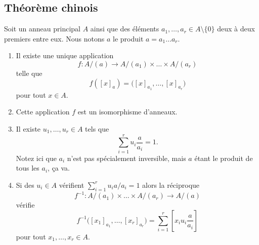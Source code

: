 \subsection{Théorème chinois}


\begin{theorem}	\label{ThofPXwiM}
	Soit un anneau principal \( A\) ainsi que des éléments \( a_1,\ldots,a_r\in A\setminus\{ 0 \}\) deux à deux premiers entre eux. Nous notons \( a\) le produit \( a=a_1\ldots a_r\).

	\begin{enumerate}
		\item		\label{ITEMooWBSWooGWjnNx}
		      Il existe une unique application
		      \begin{equation}
			      f \colon A/(a)\to A/(a_1)\times\ldots\times A/(a_r)
		      \end{equation}
		      telle que
		      \begin{equation}
			      f([x]_a)=\big( [x]_{a_1},\ldots,[x]_{a_r} \big)
		      \end{equation}
		      pour tout \( x\in A\).
		\item		\label{ITEMooANYPooGPgEQc}
		      Cette application \( f\) est un isomorphisme d'anneaux.
		\item		\label{ITEMooTUOKooHcSwTD}
		      Il existe \( u_1,\ldots,u_r\in A\) tels que
		      \begin{equation}
			      \sum_{i=1}^ru_i\frac{ a }{ a_i }=1.
		      \end{equation}
		      Notez ici que \( a_i\) n'est pas spécialement inversible, mais \( a\) étant le produit de tous les \( a_i\), ça va.
		\item		\label{ITEMooGXOEooUdKmzU}
		      Si des \( u_i\in A\) vérifient \( \sum_{i=1}^ru_ia/a_i=1\) alors la réciproque
		      \begin{equation}
			      f^{-1} \colon A/(a_1)\times \ldots\times A/(a_r)\to  	A/(a)
		      \end{equation}
		      vérifie
		      \begin{equation}
			      f^{-1}\big( [x_1]_{a_1},\ldots,[x_r]_{a_r} \big)=\sum_{i=1}^r[x_iu_i\frac{ a }{ a_i }]
		      \end{equation}
		      pour tout \( x_1,\ldots,x_r\in A\).
	\end{enumerate}
\end{theorem}


